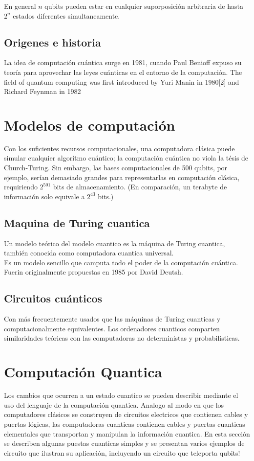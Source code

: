 \documentclass[a4paper]{article}
\begin{document}
		 En general $n$ qubits pueden estar en cualquier suporposición arbitraria de hasta $2^n$ estados diferentes simultaneamente.
		
		\subsection{Origenes e historia}
  		La idea de computación cuántica surge en 1981, cuando Paul Benioff expuso su teoría para aprovechar las leyes cuánticas en el entorno de la computación. 
  		 The field of quantum computing was first introduced by Yuri Manin in 1980[2] and Richard Feynman in 1982
  		
  	\section{Modelos de computación}
  		Con los suficientes recursos computacionales, una computadora clásica puede simular cualquier algorítmo cuántico; la computación cuántica no viola la tésis de Church-Turing. Sin embargo, las bases computacionales de 500 qubits, por ejemplo, serían demasiado grandes para representarlas en computación clásica, requiriendo $2^{501}$ bits de almacenamiento. (En comparación, un terabyte de información solo equivale a $2^{43}$ bits.)
  		\subsection{Maquina de Turing cuantica}
  		Un modelo teórico del modelo cuantico es la máquina de Turing cuantica, también conocida como computadora cuantica universal.\\
  		Es un modelo sencillo que camputa todo el poder de la computación cuántica. \\
  		Fuerin originalmente propuestas en 1985 por David Deutsh.
  		
  		\subsection{Circuitos cuánticos}
  		Con más frecuentemente usados que las máquinas de Turing cuanticas y computacionalmente equivalentes.
  		 Los ordenadores cuanticos comparten similaridades teóricas con las computadoras no deterministas y probabilisticas.
  	\section{Computación Quantica}
  		Los cambios que ocurren a un estado cuantico se pueden describir mediante el uso del lenguaje de la computación quantica. Analogo al modo en que los computadores clásicos se construyen de circuitos electricos que contienen cables y puertas lógicas, las computadoras cuanticas contienen cables y puertas cuanticas elementales que transportan y manipulan la información cuantica. En esta sección se describen algunas puestas cuanticas simples y se presentan varios ejemplos de circuito que ilustran su aplicación, incluyendo un circuito que teleporta qubits!
\end{document}
